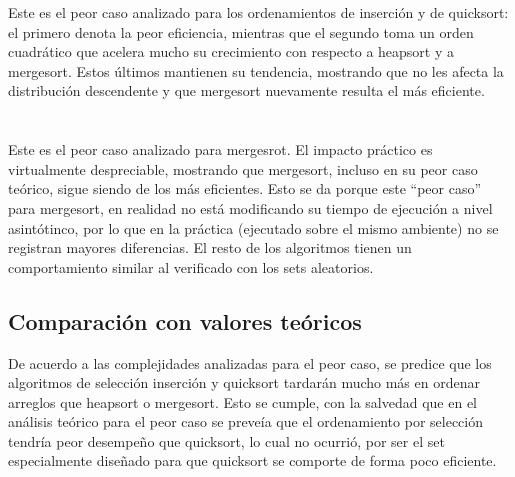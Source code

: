 \documentclass[article,a4paper]{article}
\begin{document}
Este es el peor caso analizado para los ordenamientos de inserción y de quicksort: el primero denota la peor eficiencia, mientras que el segundo toma un orden cuadrático que acelera mucho su crecimiento con respecto a heapsort y a mergesort. Estos últimos mantienen su tendencia, mostrando que no les afecta la distribución descendente y que mergesort nuevamente resulta el más eficiente.\\

\\ \\

Este es el peor caso analizado para mergesrot. El impacto práctico es virtualmente despreciable, mostrando que mergesort, incluso en su peor caso teórico, sigue siendo de los más eficientes. Esto se da porque este “peor caso” para mergesort, en realidad no está modificando su tiempo de ejecución a nivel asintótinco, por lo que en la práctica (ejecutado sobre el mismo ambiente) no se registran mayores diferencias. El resto de los algoritmos tienen un comportamiento similar al verificado con los sets aleatorios. 

\subsection{Comparación con valores teóricos}

De acuerdo a las complejidades analizadas para el peor caso, se predice que los algoritmos de selección inserción y quicksort tardarán mucho más en ordenar arreglos que heapsort o mergesort. Esto se cumple, con la salvedad que en el análisis teórico para el peor caso se preveía que el ordenamiento por selección tendría peor desempeño que quicksort, lo cual no ocurrió, por ser el set especialmente diseñado para que quicksort se comporte de forma poco eficiente.
\end{document}
